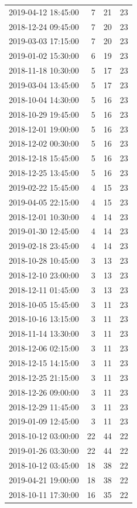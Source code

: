 \begin{tabular}{lrrr}
2019-04-12 18:45:00 & 7 & 21 & 23 \\
2018-12-24 09:45:00 & 7 & 20 & 23 \\
2019-03-03 17:15:00 & 7 & 20 & 23 \\
2019-01-02 15:30:00 & 6 & 19 & 23 \\
2018-11-18 10:30:00 & 5 & 17 & 23 \\
2019-03-04 13:45:00 & 5 & 17 & 23 \\
2018-10-04 14:30:00 & 5 & 16 & 23 \\
2018-10-29 19:45:00 & 5 & 16 & 23 \\
2018-12-01 19:00:00 & 5 & 16 & 23 \\
2018-12-02 00:30:00 & 5 & 16 & 23 \\
2018-12-18 15:45:00 & 5 & 16 & 23 \\
2018-12-25 13:45:00 & 5 & 16 & 23 \\
2019-02-22 15:45:00 & 4 & 15 & 23 \\
2019-04-05 22:15:00 & 4 & 15 & 23 \\
2018-12-01 10:30:00 & 4 & 14 & 23 \\
2019-01-30 12:45:00 & 4 & 14 & 23 \\
2019-02-18 23:45:00 & 4 & 14 & 23 \\
2018-10-28 10:45:00 & 3 & 13 & 23 \\
2018-12-10 23:00:00 & 3 & 13 & 23 \\
2018-12-11 01:45:00 & 3 & 13 & 23 \\
2018-10-05 15:45:00 & 3 & 11 & 23 \\
2018-10-16 13:15:00 & 3 & 11 & 23 \\
2018-11-14 13:30:00 & 3 & 11 & 23 \\
2018-12-06 02:15:00 & 3 & 11 & 23 \\
2018-12-15 14:15:00 & 3 & 11 & 23 \\
2018-12-25 21:15:00 & 3 & 11 & 23 \\
2018-12-26 09:00:00 & 3 & 11 & 23 \\
2018-12-29 11:45:00 & 3 & 11 & 23 \\
2019-01-09 12:45:00 & 3 & 11 & 23 \\
2018-10-12 03:00:00 & 22 & 44 & 22 \\
2019-01-26 03:30:00 & 22 & 44 & 22 \\
2018-10-12 03:45:00 & 18 & 38 & 22 \\
2019-04-21 19:00:00 & 18 & 38 & 22 \\
2018-10-11 17:30:00 & 16 & 35 & 22 \\

\end{tabular}
